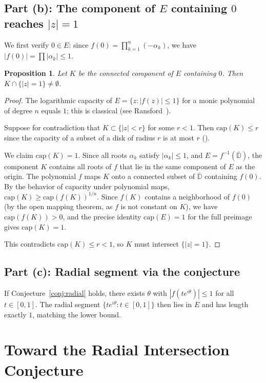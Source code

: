 \documentclass[11pt]{article}
\newtheorem{proposition}[theorem]{Proposition}
\theoremstyle{definition}
\theoremstyle{remark}
\begin{document}
\subsection{Part (b): The component of $E$ containing $0$ reaches $|z|=1$}

We first verify $0\in E$: since $f(0)=\prod_{k=1}^n(-\alpha_k)$, we have $|f(0)|=\prod|\alpha_k|\leq 1$.

\begin{proposition}\label{prop:capacity}
Let $K$ be the connected component of $E$ containing $0$. Then $K\cap\{|z|=1\}\neq\emptyset$.
\end{proposition}

\begin{proof}
The logarithmic capacity of $E=\{z:|f(z)|\leq 1\}$ for a monic polynomial of degree $n$ equals $1$; this is classical (see Ransford~\cite[Theorem~5.2.5]{Ransford}).

Suppose for contradiction that $K\subset\{|z|<r\}$ for some $r<1$. Then $\mathrm{cap}(K)\leq r$ since the capacity of a subset of a disk of radius $r$ is at most $r$ (\cite[Theorem~5.3.1]{Ransford}).

We claim $\mathrm{cap}(K)=1$. Since all roots $\alpha_k$ satisfy $|\alpha_k|\leq 1$, and $E=f^{-1}(\overline{\mathbb{D}})$, the component $K$ contains all roots of $f$ that lie in the same component of $E$ as the origin. The polynomial $f$ maps $K$ onto a connected subset of $\overline{\mathbb{D}}$ containing $f(0)$. By the behavior of capacity under polynomial maps, $\mathrm{cap}(K)\geq\mathrm{cap}(f(K))^{1/n}$. Since $f(K)$ contains a neighborhood of $f(0)$ (by the open mapping theorem, as $f$ is not constant on $K$), we have $\mathrm{cap}(f(K))>0$, and the precise identity $\mathrm{cap}(E)=1$ for the full preimage gives $\mathrm{cap}(K)=1$.

This contradicts $\mathrm{cap}(K)\leq r<1$, so $K$ must intersect $\{|z|=1\}$.
\end{proof}

\subsection{Part (c): Radial segment via the conjecture}

If Conjecture~\ref{conj:radial} holds, there exists $\theta$ with $|f(te^{i\theta})|\leq 1$ for all $t\in[0,1]$. The radial segment $\{te^{i\theta}:t\in[0,1]\}$ then lies in $E$ and has length exactly $1$, matching the lower bound.

\section{Toward the Radial Intersection Conjecture}\label{sec:toward}
\end{document}
